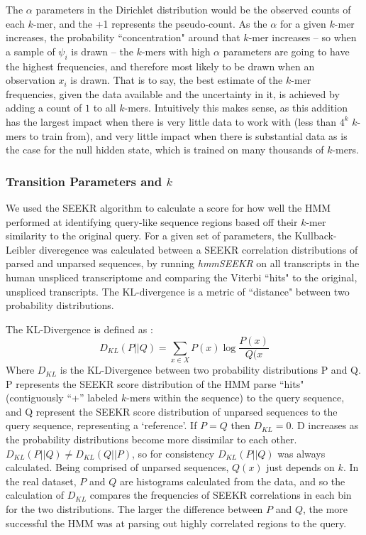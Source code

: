The $\alpha$ parameters in the Dirichlet distribution would be the observed counts of each $k$-mer, and the +1 represents the pseudo-count. As the $\alpha$ for a given $k$-mer increases, the probability ``concentration" around that $k$-mer increases -- so when a sample of $\psi_i$ is drawn -- the $k$-mers with high $\alpha$ parameters are going to have the highest frequencies, and therefore most likely to be drawn when an observation $x_i$ is drawn. That is to say, the best estimate of the $k$-mer frequencies, given the data available and the uncertainty in it, is achieved by adding a count of $1$ to all $k$-mers. Intuitively this makes sense, as this addition has the largest impact when there is very little data to work with (less than $4^k$ $k$-mers to train from), and very little impact when there is substantial data as is the case for the null hidden state, which is trained on many thousands of $k$-mers.

\subsubsection{Transition Parameters and $k$}

We used the SEEKR algorithm to calculate a score for how well the HMM performed at identifying query-like sequence regions based off their $k$-mer similarity to the original query.  For a given set of parameters, the Kullback-Leibler diveregence was calculated between a SEEKR correlation distributions of parsed and unparsed sequences, by running \emph{hmmSEEKR} on all transcripts in the human unspliced transcriptome and comparing the Viterbi ``hits" to the original, unspliced transcripts. The KL-divergence is a metric of ``distance" between two probability distributions. 

The KL-Divergence is defined as \cite{Brookes1951FoundationsProbability}:
\begin{equation}
    D_{KL}(P||Q) = \sum_{x\in X}P(x)\log{\frac{P(x)}{Q(x}}
\end{equation}
Where $D_{KL}$ is the KL-Divergence between two probability distributions P and Q. P represents the SEEKR score distribution of the HMM parse ``hits" (contiguously ``+'' labeled $k$-mers within the sequence) to the query sequence, and Q represent the SEEKR score distribution of unparsed sequences to the query sequence, representing a ‘reference’. If $P = Q$ then $D_{KL} = 0$. D increases as the probability distributions become more dissimilar to each other. $D_{KL}(P||Q) \neq D_{KL}(Q||P)$, so for consistency $D_{KL}(P||Q)$ was always calculated. Being comprised of unparsed sequences, $Q(x)$ just depends on $k$.
In the real dataset, $P$ and $Q$ are histograms calculated from the data, and so the calculation of $D_{KL}$ compares the frequencies of SEEKR correlations in each bin for the two distributions. The larger the difference between $P$ and $Q$, the more successful the HMM was at parsing out highly correlated regions to the query.


